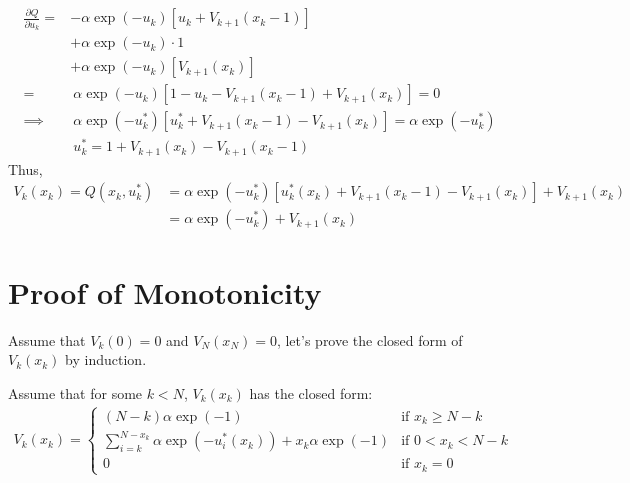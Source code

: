 \documentclass[11pt, a4paper, oneside]{memoir}
\begin{document}
\begin{align*}
  \frac{\partial Q}{\partial u_k} =& -\alpha \exp (-u_k) \left[ u_k + V_{k+1}(x_k-1) \right] \\
  &+ \alpha \exp (-u_k) \cdot 1 \\
  &+ \alpha \exp (-u_k) \left[ V_{k+1}(x_k) \right] \\
  =& ~\alpha \exp (-u_k) \left[ 1 - u_k - V_{k+1}(x_k-1) + V_{k+1}(x_k) \right] = 0 \\
  \implies& ~\alpha \exp (-u_k^*) \left[ u_k^* + V_{k+1}(x_k-1) - V_{k+1}(x_k) \right] = \alpha \exp (-u_k^*) \\
  & ~u^*_k = 1 + V_{k+1}(x_k) - V_{k+1}(x_k-1)
\end{align*}
Thus,
\begin{align*}
  V_k(x_k) = Q(x_k, u_k^*) &= \alpha \exp(-u_k^*) \left[ u_k^*(x_k) + V_{k+1}(x_k-1) - V_{k+1}(x_k) \right] + V_{k+1}(x_k)\\
  &= \alpha \exp (-u_k^*) + V_{k+1}(x_k)
\end{align*}


\section{Proof of Monotonicity}
Assume that $V_k(0) = 0$ and $V_{N}(x_{N}) = 0$, let's prove the closed form of $V_k(x_k)$ by induction.

Assume that for some $k < N$, $V_k(x_k)$ has the closed form:
\begin{align*}
  V_k(x_k) = 
  \begin{cases}
    (N-k)\alpha \exp(-1) & \text{if } x_k \geq N-k \\
    \sum_{i=k}^{N-x_k} \alpha \exp(-u_i^*(x_k)) + x_k \alpha \exp(-1) & \text{if } 0 < x_k < N-k \\
    0 & \text{if } x_k = 0
  \end{cases}
\end{align*}
\end{document}
